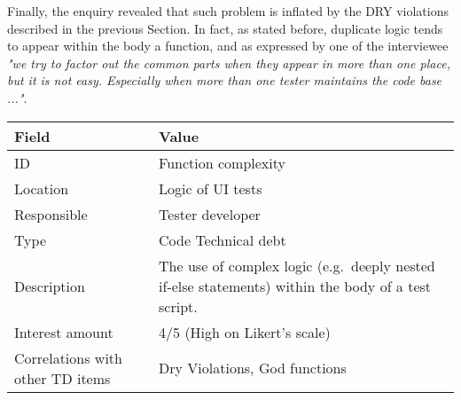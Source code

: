     Finally, the enquiry revealed that such problem is inflated by the DRY violations described in the previous Section. In fact, as stated before, duplicate logic tends to appear within the body a function, and as expressed by one of the interviewee \textit{"we try to factor out the common parts when they appear in more than one place, but it is not easy. Especially when more than one tester maintains the code base ..."}.
        
    	
	
	\begin{table}[!htbp]
		\centering
		\tabulinesep=1.2mm
		\begin{tabu} to \textwidth {|X|X[3]|}
			
			\hline
			\textbf{Field} & \textbf{Value} \\ 
			\hline
			
			ID & Function complexity \\
			\hline
			
			Location & Logic of UI tests \\
			\hline
			
			Responsible & Tester developer \\
			\hline
			
			Type & Code Technical debt \\
			\hline	
			
			Description & The use of complex logic (e.g.\ deeply nested if-else statements) within the body of a test script.\\
			\hline
			
			
			
			Interest amount &  4/5 (High on Likert's scale) \\
			\hline
			
			
			
			Correlations with other TD items & Dry Violations, God functions\\
			\hline 	 
			
			

\end{tabu}
\end{table}
